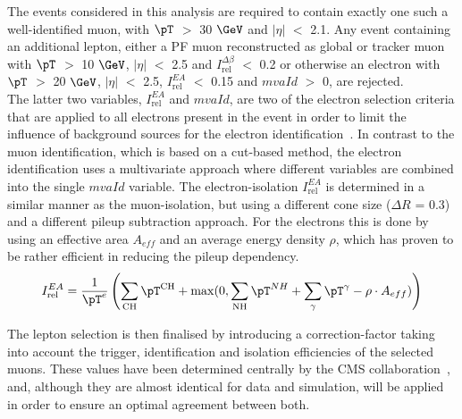 The events considered in this analysis are required to contain exactly one such a well-identified muon, with $\pT$ $>$ 30 $\GeV$ and $\vert \eta \vert$ $<$ 2.1. Any event containing an additional lepton, either a PF muon reconstructed as global or tracker muon with $\pT$ $>$ 10 $\GeV$, $\vert \eta \vert$ $<$ 2.5 and $I_{\textrm{rel}}^{\Delta \beta}$ $<$ 0.2 or otherwise an electron with $\pT$ $>$ 20 $\GeV$, $\vert \eta \vert$ $<$ 2.5, $I_{\textrm{rel}}^{EA}$ $<$ 0.15 and $mvaId$ $>$ 0, are rejected. 
\\
The latter two variables, $I_{\textrm{rel}}^{EA}$ and $mvaId$, are two of the electron selection criteria that are applied to all electrons present in the event in order to limit the influence of background sources for the electron identification~\cite{ElId8TeV}. In contrast to the muon identification, which is based on a cut-based method, the electron identification uses a multivariate approach where different variables are combined into the single $mvaId$ variable.
The electron-isolation $I_{\textrm{rel}}^{EA}$ is determined in a similar manner as the muon-isolation, but using a different cone size ($\Delta R$ = 0.3) and a different pileup subtraction approach. For the electrons this is done by using an effective area $A_{eff}$ and an average energy density $\rho$, which has proven to be rather efficient in reducing the pileup dependency.%
\begin{equation}\label{eq::DeltaBetaIso}
 I_{\textrm{rel}}^{EA} = \frac{1}{\pT^{e}} \left( \sum_{\textrm{CH}} \pT^{\textrm{CH}} + \max(0, \sum_{\textrm{NH}} \pT^{NH} + \sum_{\gamma} \pT^{\gamma} - \rho \cdot A_{eff}) \right)
\end{equation}

The lepton selection is then finalised by introducing a correction-factor taking into account the trigger, identification and isolation efficiencies of the selected muons.
These values have been determined centrally by the CMS collaboration~\cite{MuonPerf8TeV}, and, although they are almost identical for data and simulation, will be applied in order to ensure an optimal agreement between both.

